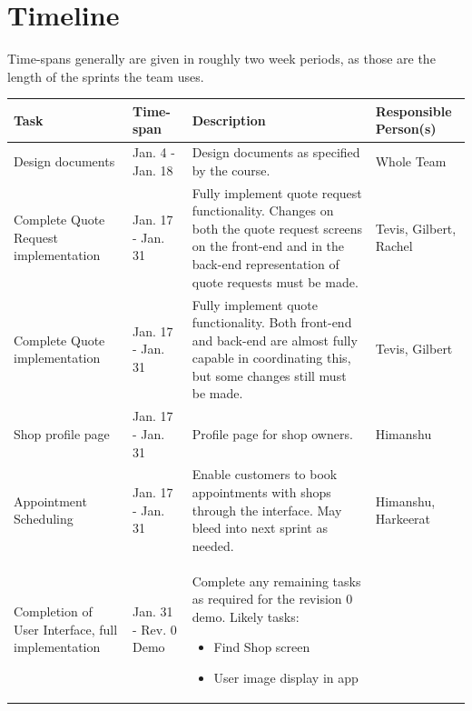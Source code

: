 \documentclass[12pt, titlepage]{article}
\begin{document}
\section{Timeline}

Time-spans generally are given in roughly two week periods, as those are the length of the sprints the team uses. \\

\begin{longtable}{ p{3cm}p{3.5cm}p{5cm}p{3cm}  }
 \hline
 \textbf{Task} & \textbf{Time-span} & \textbf{Description} & \textbf{Responsible Person(s)} \\
 \hline
 Design documents & Jan. 4 - Jan. 18 & Design documents as specified by the course. & Whole Team \\
 \hline
 Complete Quote Request implementation & Jan. 17 - Jan. 31 & Fully implement quote request functionality. Changes on both the quote request screens on the front-end and in the back-end representation of quote requests must be made. & Tevis, Gilbert, Rachel \\
 \hline
 Complete Quote implementation & Jan. 17 - Jan. 31 & Fully implement quote functionality. Both front-end and back-end are almost fully capable in coordinating this, but some changes still must be made. & Tevis, Gilbert \\
 \hline
 Shop profile page & Jan. 17 - Jan. 31 & Profile page for shop owners. & Himanshu \\
 \hline
 Appointment Scheduling & Jan. 17 - Jan. 31 & Enable customers to book appointments with shops through the interface. May bleed into next sprint as needed. & Himanshu, Harkeerat \\
 \hline
  Completion of User Interface, full implementation & Jan. 31 - Rev. 0 Demo & Complete any remaining tasks as required for the revision 0 demo.  Likely tasks:
    \begin{itemize}
        \item Find Shop screen
        \item User image display in app
        

\end{itemize}
\end{longtable}
\end{document}
